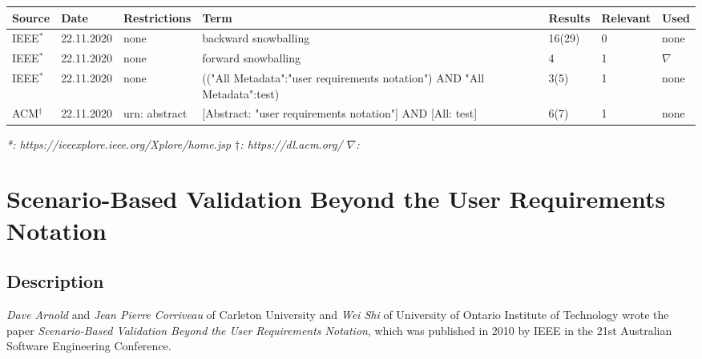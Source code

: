 \begin{table}[h]
	\caption{Literature Research Documentation.}
	\begin{longtable}{|p{1cm}|p{1.5cm}|>{\raggedright}p{2cm}|>{\raggedright}p{3.7cm}|p{1.3cm}|p{1.4cm}|p{0.7cm}|}
		\hline
		\textbf{Source} & \textbf{Date} & \textbf{Restrictions} & \textbf{Term} & \textbf{Results} & \textbf{Relevant} & \textbf{Used}\\
		\hline
		IEEE$^*$ & 22.11.2020 & none & backward snowballing & 16(29) & 0 & none \\
		\hline
		IEEE$^*$ & 22.11.2020 & none & forward snowballing & 4 & 1 & $\nabla$ \\
		\hline
		IEEE$^*$ & 22.11.2020 & none & (("All Metadata":"user requirements notation") AND "All Metadata":test) & 3(5) & 1 & none\\
		\hline
		ACM$^\dagger$ & 22.11.2020 & urn: abstract & [Abstract: "user requirements notation"] AND [All: test] & 6(7) & 1 & none \\
		\hline
	\end{longtable}
	\textit{*: https://ieeexplore.ieee.org/Xplore/home.jsp \quad $\dagger$: https://dl.acm.org/ \quad $\nabla$: \cite{BoucherMussbacher2017}}
	\label{tab:08_research}
\end{table}
\newpage
\section{Scenario-Based Validation Beyond the User Requirements Notation\cite{ArnoldCorriveauShi2010}}
\label{topic08:sectionApproach1}

\subsection{Description}

\textit{Dave Arnold} and \textit{Jean Pierre Corriveau} of Carleton University and \textit{Wei Shi} of University of Ontario Institute of Technology wrote the paper \textit{Scenario-Based Validation Beyond the User Requirements Notation}, which was published in 2010 by IEEE in the 21st Australian Software Engineering Conference.

